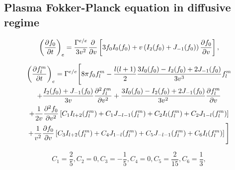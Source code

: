 \subsection{Plasma Fokker-Planck equation in diffusive regime}
\begin{equation}
  \left(\frac{\partial{f_0}}{\partial{t}}\right)_{e} =
  \frac{\Gamma^{e/e}}{3v^2}\frac{\partial{}}{\partial{v}}\left[3 
  f_0 I_0(f_0) + v \left( I_2(f_0) + J_{-1}(f_0)\right)
  \frac{\partial{f_0}}{\partial{v}} \right] ,
  \nonumber
\end{equation}

\begin{multline}
  \left(\frac{\partial{f_l^m}}{\partial{t}}\right)_{e} = \Gamma^{e/e} \Bigg[
  8\pi f_0 f_l^m  
  - \frac{l(l+1)}{2}
  \frac{3 I_0(f_0) - I_2(f_0) + 2 J_{-1}(f_0)}{3v^3} f_l^m
  \\
  + \frac{I_2(f_0) + J_{-1}(f_0)}{3v}
  \frac{\partial^2 f_l^m}{\partial v^2} + 
  \frac{3 I_0(f_0) - I_2(f_0) + 2 J_{-1}(f_0)}{3v^2}
  \frac{\partial{f_l^m}}{\partial{v}} 
  \\
  + \frac{1}{2 v} \frac{\partial^2 f_0}{\partial v^2}
  \left[C_1 I_{l+2}(f_l^m) + C_1 J_{-l-1}(f_l^m) + C_2 I_l(f_l^m) 
  + C_2 J_{1-l}(f_l^m) \right]
  \\
  + \frac{1}{v^2} \frac{\partial{f_0}}{\partial{v}}
  \left[C_3 I_{l+2}(f_l^m) + C_4 J_{1-l}(f_l^m) + C_5 J_{-l-1}(f_l^m) 
  + C_6 I_l(f_l^m) \right] \Bigg]
\end{multline}

\begin{equation}
  C_1 = \frac{2}{5}, 
  C_2 = 0,
  C_3 = -\frac{1}{5},
  C_4 = 0,
  C_5 = \frac{2}{15}, 
  C_6 = \frac{1}{3}, 
  \nonumber
\end{equation}


